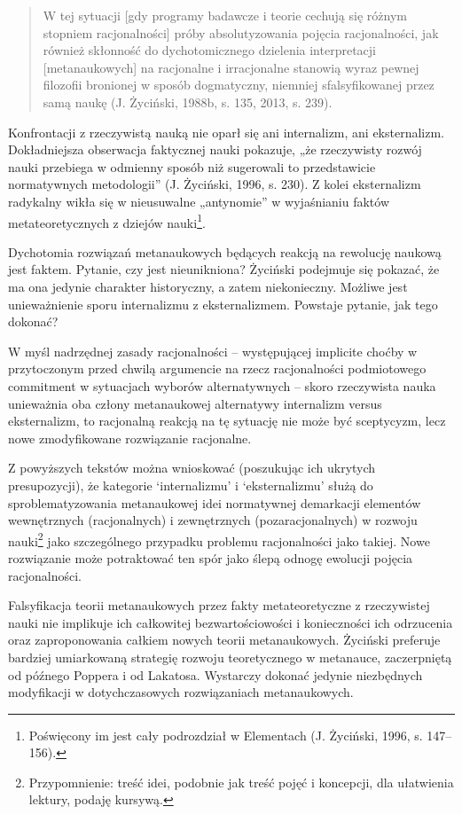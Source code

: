\documentclass{article}
\begin{document}
\begin{quotation}
W tej sytuacji [gdy programy badawcze i teorie cechują się różnym stopniem racjonalności] próby absolutyzowania pojęcia
racjonalności, jak również skłonność do dychotomicznego dzielenia interpretacji [metanaukowych] na racjonalne i
irracjonalne stanowią wyraz pewnej filozofii bronionej w sposób dogmatyczny, niemniej sfalsyfikowanej przez samą naukę 
\label{ref:RNDmPUxCCAI7w}(J. Życiński, 1988b, s. 135, 2013, s. 239).

\end{quotation}
Konfrontacji z rzeczywistą nauką nie oparł się ani internalizm, ani eksternalizm. Dokładniejsza obserwacja faktycznej
nauki pokazuje, „że rzeczywisty rozwój nauki przebiega w odmienny sposób niż sugerowali to przedstawicie normatywnych
metodologii” \label{ref:RNDWCF6lU0sbi}(J. Życiński, 1996, s. 230). Z kolei eksternalizm radykalny wikła się w
nieusuwalne „antynomie” w wyjaśnianiu faktów metateoretycznych z dziejów nauki\footnote{Poświęcony im jest cały
podrozdział w Elementach \label{ref:RNDrpsugHpH8D}(J. Życiński, 1996, s. 147–156).}.

Dychotomia rozwiązań metanaukowych będących reakcją na rewolucję naukową jest faktem. Pytanie, czy jest nieunikniona?
Życiński podejmuje się pokazać, że ma ona jedynie charakter historyczny, a zatem niekonieczny. Możliwe jest
unieważnienie sporu internalizmu z eksternalizmem. Powstaje pytanie, jak tego dokonać?

W myśl nadrzędnej zasady racjonalności – występującej implicite choćby w przytoczonym przed chwilą argumencie na rzecz
racjonalności podmiotowego commitment w sytuacjach wyborów alternatywnych – skoro rzeczywista nauka unieważnia oba
człony metanaukowej alternatywy internalizm versus eksternalizm, to racjonalną reakcją na tę sytuację nie może być
sceptycyzm, lecz nowe zmodyfikowane rozwiązanie racjonalne.

Z powyższych tekstów można wnioskować (poszukując ich ukrytych presupozycji), że kategorie ‘internalizmu’ i
‘eksternalizmu’ służą do sproblematyzowania metanaukowej idei normatywnej demarkacji elementów wewnętrznych
(racjonalnych) i zewnętrznych (pozaracjonalnych) w rozwoju nauki\footnote{Przypomnienie: treść idei, podobnie jak treść
pojęć i koncepcji, dla ułatwienia lektury, podaję kursywą.} jako szczególnego przypadku problemu racjonalności jako
takiej. Nowe rozwiązanie może potraktować ten spór jako ślepą odnogę ewolucji pojęcia racjonalności.

Falsyfikacja teorii metanaukowych przez fakty metateoretyczne z rzeczywistej nauki nie implikuje ich całkowitej
bezwartościowości i konieczności ich odrzucenia oraz zaproponowania całkiem nowych teorii metanaukowych. Życiński
preferuje bardziej umiarkowaną strategię rozwoju teoretycznego w metanauce, zaczerpniętą od późnego Poppera i od
Lakatosa. Wystarczy dokonać jedynie niezbędnych modyfikacji w dotychczasowych rozwiązaniach metanaukowych. 
\end{document}
